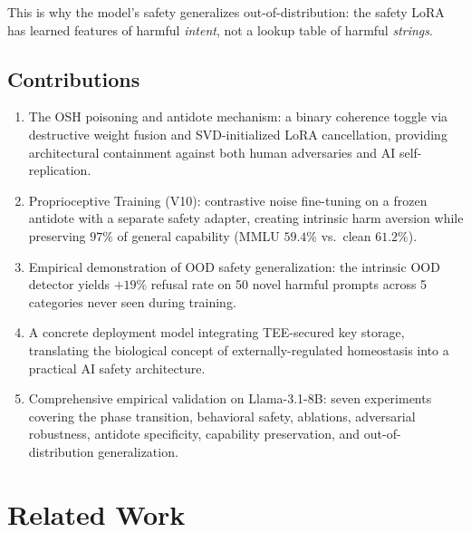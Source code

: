\documentclass[10pt,letterpaper]{article}
\begin{document}
This is why the model's safety generalizes out-of-distribution: the safety LoRA
has learned features of harmful \emph{intent}, not a lookup table of harmful
\emph{strings}.

\subsection{Contributions}
\begin{enumerate}
    \item The OSH poisoning and antidote mechanism: a binary coherence toggle
          via destructive weight fusion and SVD-initialized LoRA cancellation,
          providing architectural containment against both human adversaries and
          AI self-replication.
    \item Proprioceptive Training (V10): contrastive noise fine-tuning on a
          frozen antidote with a separate safety adapter, creating intrinsic harm
          aversion while preserving $97\%$ of general capability (MMLU $59.4\%$
          vs.\ clean $61.2\%$).
    \item Empirical demonstration of OOD safety generalization: the intrinsic
          OOD detector yields $+19\%$ refusal rate on 50 novel harmful prompts
          across 5 categories never seen during training.
    \item A concrete deployment model integrating TEE-secured key storage,
          translating the biological concept of externally-regulated homeostasis
          into a practical AI safety architecture.
    \item Comprehensive empirical validation on Llama-3.1-8B: seven experiments
          covering the phase transition, behavioral safety, ablations, adversarial
          robustness, antidote specificity, capability preservation, and
          out-of-distribution generalization.
\end{enumerate}

\section{Related Work}
\end{document}
